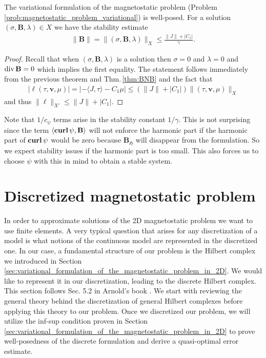 \documentclass[../master_thesis.tex]{subfiles}
\begin{document}
\begin{corollary}
    The variational formulation of the magnetostatic problem 
    {\normalfont (Problem\,\ref{prob:magnetostatic_problem_variational})} is well-posed. 
    For a solution $(\sigma, \mathbf{B},\lambda) \in X$
    we have the stability estimate 
    \begin{align*}
        \lVert \mathbf{B} \rVert  = \lVert (\sigma, \mathbf{B}, \lambda )\rVert _X 
        \leq \frac{\lVert J \rVert + |C_1|}{\gamma}.
    \end{align*}
\end{corollary}
\begin{proof}
    Recall that when $(\sigma, \mathbf{B},\lambda)$ is a solution 
    then $\sigma = 0$ and $\lambda = 0$ and $\operatorname{div} \mathbf{B}=0$ which implies the 
    first equality.
    The statement follows immediately from the previous theorem and 
    Thm.\,\ref{thm:BNB} and the fact that 
    \begin{align*}
        | \ell(\tau,\mathbf{v},\mu) |
        = | - \langle J, \tau \rangle - C_1 \mu | 
        \leq (\lVert J \rVert + | C_1 |) \lVert (\tau,\mathbf{v},\mu) \rVert _X
    \end{align*}
    and thus $\lVert \ell \rVert _{X'} \leq \lVert J \rVert + | C_1 |$.
\end{proof}

\begin{remark}
    Note that $1/c_\psi$ terms arise
    in the stability constant $1/\gamma$. This is not surprising since the term 
    $\langle \veccurl \psi, \mathbf{B} \rangle$ will not enforce the harmonic 
    part if the harmonic part of $\veccurl \psi$ would be zero because 
    $\mathbf{B}_\mathfrak{H}$ will disappear from the formulation. So we 
    expect stability issues if the harmonic part is too small.
    This also forces us to choose $\psi$ with this in mind to obtain a 
    stable system.
\end{remark}

\section{Discretized magnetostatic problem}

In order to approximate solutions of the  2D magnetostatic problem we want to use finite elements.
A very typical question that arises for any discretization of a model is what 
notions of the continuous model are represented in the discretized one. 
In our case, a fundamental structure of our problem is the Hilbert complex we introduced in Section\,
\ref{sec:variational_formulation_of_the_magnetostatic_problem_in_2D}.
We would like to represent it in our discretization, leading to the discrete Hilbert complex. 
This section follows Sec. 5.2 in Arnold's book \cite{arnold}. We start with reviewing the 
general theory behind the discretization of general Hilbert complexes before applying this 
theory to our problem. Once we discretized our problem, we will utilize
the inf-sup condition proven in Section\,\ref{sec:variational_formulation_of_the_magnetostatic_problem_in_2D} 
to prove well-posedness of 
the discrete formulation and derive a quasi-optimal error estimate.
\end{document}
